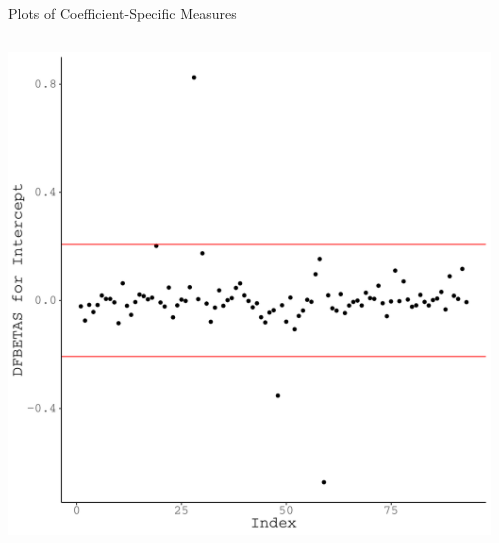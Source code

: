 \documentclass{beamer}\usepackage[]{graphicx}\usepackage[]{color}
\makeatletter
\def\maxwidth{ %
  \ifdim\Gin@nat@width>\linewidth
    \linewidth
  \else
    \Gin@nat@width
  \fi
}
\newenvironment{knitrout}{}{} %
\makeatother
\begin{document}
\watermarkoff %

\begin{frame}{Plots of Coefficient-Specific Measures}
  
  \begin{columns}
    \begin{column}{0.5\textwidth}
      
\begin{knitrout}\footnotesize
{}\color{fgcolor}

{\centering \includegraphics[width=\maxwidth]{figure/unnamed-chunk-32-1} 

}



\end{knitrout}

\end{column}
    
    \begin{column}{0.5\textwidth}

\begin{knitrout}\footnotesize
{}\color{fgcolor}


\end{knitrout}
\end{column}
\end{columns}
\end{frame}
\end{document}
